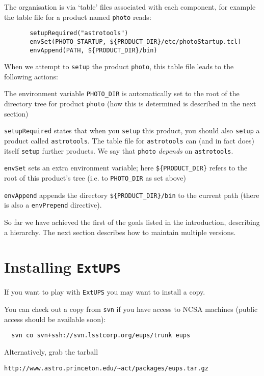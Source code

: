 \documentclass{article}
\newcommand{\code}[1]{\texttt{#1}}
\newcommand{\eups}{\code{ExtUPS}}
\begin{document}
The organisation is via `table' files
associated with each component, for example the table file
for a product named \code{photo} reads:
\begin{verbatim}
       setupRequired("astrotools")
       envSet(PHOTO_STARTUP, ${PRODUCT_DIR}/etc/photoStartup.tcl)
       envAppend(PATH, ${PRODUCT_DIR}/bin)
\end{verbatim}

When we attempt to \code{setup} the product \code{photo}, this
table file leads to the following actions:
\begin{description}
\item
  The environment variable \code{PHOTO\_DIR} is automatically set to 
  the root of the directory tree for product \code{photo} (how this
  is determined is described in the next section)
\item
  \code{setupRequired} states that when you \code{setup} this product, you
  should also \code{setup} a product called \code{astrotools}.
  The table file for \code{astrotools} can
  (and in fact does) itself \code{setup} further products.  We say that
  \code{photo} \emph{depends} on \code{astrotools}.
\item
  \code{envSet} sets an extra environment variable; here \code{\$\{PRODUCT\_DIR\}}
  refers to the root of this product's tree (i.e. to \code{PHOTO\_DIR} as set above)
\item
  \code{envAppend} appends
  the directory \code{\$\{PRODUCT\_DIR\}/bin} to the current path (there
  is also a \code{envPrepend} directive).
\end{description}

So far we have achieved the first of the goals listed in the introduction,
describing a hierarchy.  The next section describes how to maintain
multiple versions.

\section{Installing \eups}

If you want to play with \eups{} you may want to install a copy.

You can check out a copy from \code{svn} if you have access to
NCSA machines (public access should be available soon):
\begin{verbatim}
  svn co svn+ssh://svn.lsstcorp.org/eups/trunk eups
\end{verbatim}

Alternatively, grab the tarball
\begin{verbatim}
http://www.astro.princeton.edu/~act/packages/eups.tar.gz
\end{verbatim}
\end{document}
